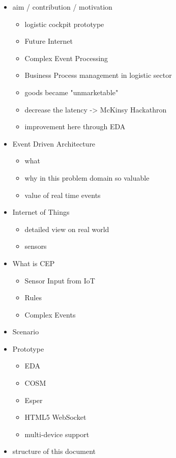 \documentclass{acm_proc_article-sp}
\begin{document}
\begin{itemize}
	\item aim / contribution / motivation
		\begin{itemize}
			\item logistic cockpit prototype
			\item Future Internet
			\item Complex Event Processing
			\item Business Process management in logistic sector
			\item goods became "unmarketable"
			\item decrease the latency -> McKinsy Hackathron
			\item improvement here through EDA
		\end{itemize}
	\item Event Driven Architecture
		\begin{itemize}
			\item what
			\item why in this problem domain so valuable 
			\item value of real time events
		\end{itemize}
	\item Internet of Things
		\begin{itemize}
			\item detailed view on real world
			\item sensors
		\end{itemize}
	\item What is CEP
		\begin{itemize}
			\item Sensor Input from IoT
			\item Rules
			\item Complex Events
		\end{itemize}
	\item Scenario
	\item Prototype
			\begin{itemize}
				\item EDA
				\item COSM
				\item Esper
				\item HTML5 WebSocket
				\item multi-device support
			\end{itemize}			
		
\item structure of this document								 
\end{itemize}
\end{document}

